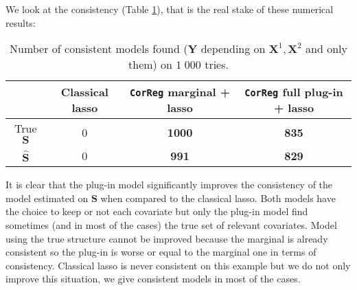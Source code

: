 \documentclass[12pt,a4paper]{report}
\begin{document}
		We look at the consistency (Table \ref{testidentifiableG}), that is the real stake of these numerical results:
		\begin{table}[h!]	
		\centering
		\begin{tabular}{|c|c|c|c|}
		\hline 
		 & Classical {\sc lasso} & {\tt CorReg}  marginal + {\sc lasso}& {\tt CorReg}  full plug-in  + {\sc lasso} \\ 
		\hline 
		True $\boldsymbol{S}$ &  0 & \textbf{1000} & \textbf{835} \\ 
		\hline 
		$\hat{\boldsymbol{S}}$ & 0 & \textbf{991} & \textbf{829} \\ 
		\hline 
		\end{tabular} 
		\caption{Number of consistent models found ($\boldsymbol{Y}$ depending on $\boldsymbol{X}^1,\boldsymbol{X}^2$ and only them) on $1\;000$ tries.}\label{testidentifiableG}
		\end{table}	
		\FloatBarrier			
		It is clear that the plug-in model significantly improves the consistency of the model estimated on $\boldsymbol{S}$ when compared to the classical {\sc lasso}. Both models have the choice to keep or not each covariate but only the plug-in model find sometimes (and in most of the cases) the true set of relevant covariates. Model using the true structure cannot be improved because the marginal is already consistent so the plug-in is worse or equal to the marginal one in terms of consistency. Classical {\sc lasso} is never consistent on this example but we do not only improve this situation, we give consistent models in most of the cases.\\
		
\end{document}
